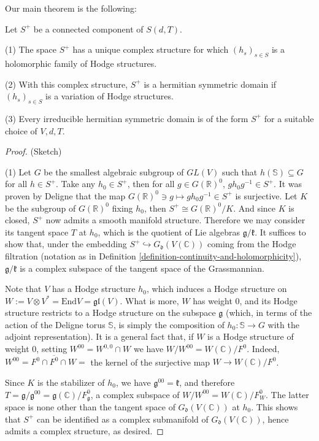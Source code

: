 Our main theorem is the following:

\begin{theorem}
 \label{theorem-Hermitian-for-Hodge}
 Let $S^+$ be a connected component of $S(d,T)$.

(1) The space $S^+$ has a unique complex structure for which $(h_s)_{s\in S}$ is a holomorphic family of Hodge structures.

(2) With this complex structure, $S^+$ is a hermitian symmetric domain if $(h_s)_{s\in S}$ is a variation of Hodge structures.

(3) Every irreducible hermitian symmetric domain is of the form $S^+$ for a suitable choice of $V,d, T$.
\end{theorem}


\begin{proof}

(Sketch)

(1) Let $G$ be the smallest algebraic subgroup of $GL(V)$ such that $h(\mathbb S) \subseteq G$ for all $h \in S^+$.  Take any $h_0 \in S^+$, then for all $g \in G(\mathbb R)^0$, $gh_0g^{-1}\in S^+$. It was proven by Deligne \cite{Deligne-Shimura} that the map $G(\mathbb R)^0 \ni g\mapsto gh_0g^{-1} \in S^+$ is surjective. Let $K$ be the subgroup of $G(\mathbb R)^0$ fixing $h_0$, then $S^+ \cong G(\mathbb R)^0/K$. And since $K$ is closed, $S^+$ now admits a smooth manifold structure. Therefore we may consider its tangent space $T$ at $h_0$, which is the quotient of Lie algebras $\mathfrak g / \mathfrak k$. It suffices to show that, under the embedding $S^+\hookrightarrow G_ \mathfrak d(V(\mathbb C))$ coming from the Hodge filtration (notation as in Definition \ref{definition-continuity-and-holomorphicity}), $\mathfrak g / \mathfrak k$ is a complex subspace of the tangent space of the Grassmannian.

Note that $V$ has a Hodge structure $h_0$, which induces a Hodge structure on $W:=V\otimes V ^* =\text{End}V = \mathfrak{gl}(V)$. What is more, $W$ has weight 0, and its Hodge structure restricts to a Hodge structure on the subspace $\mathfrak g$ (which, in terms of the action of the Deligne torus $\mathbb S$, is simply the composition of $h_0:\mathbb S\to G$ with the adjoint representation).
It is a general fact that, if $W$ is a Hodge structure of weight 0, setting $W^{00}=W^{0,0} \cap W$ we have $W/W^{00}=W(\mathbb C)/ F^0$. Indeed, $W^{00}=F^0 \cap \overline{F^0} \cap W =$ the kernel of the surjective map $W \to W(\mathbb C)/F^0$.

Since $K$ is the stabilizer of $h_0$, we have $\mathfrak g^{00}=\mathfrak k$, and  therefore $T=\mathfrak g /\mathfrak g ^{00} = \mathfrak g(\mathbb C)/F^0_{\mathfrak g}$, a complex subspace of  $W/W^{00} = W(\mathbb C)/F_W^0$. The latter space is none other than the tangent space of $G_ \mathfrak d(V(\mathbb C))$ at $h_0$. This shows that $S^+$ can be identified as a complex submanifold of $G_ \mathfrak d(V(\mathbb C))$, hence admits a complex structure, as desired.


\end{proof}
